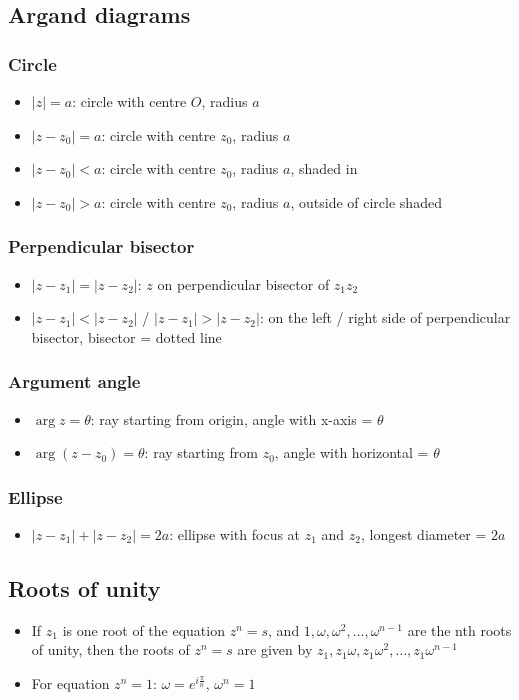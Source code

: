 \subsection{Argand diagrams}
\subsubsection{Circle}
\begin{itemize}
	\item $|z| = a$: circle with centre $O$, radius $a$
	\item $|z-z_0|=a$: circle with centre $z_0$, radius $a$
	\item $|z-z_0|<a$: circle with centre $z_0$, radius $a$, shaded in
	\item $|z-z_0|>a$: circle with centre $z_0$, radius $a$, outside of circle shaded
\end{itemize}
\subsubsection{Perpendicular bisector}
\begin{itemize}
	\item $|z-z_1|=|z-z_2|$: $z$ on perpendicular bisector of $z_1z_2$
	\item $|z-z_1|<|z-z_2|$ / $|z-z_1|>|z-z_2|$: on the left / right side of perpendicular bisector, bisector = dotted line
\end{itemize}
\subsubsection{Argument angle}
\begin{itemize}
	\item $\arg z = \theta$: ray starting from origin, angle with x-axis = $\theta$
	\item $\arg (z-z_0) = \theta$: ray starting from $z_0$, angle with horizontal = $\theta$
\end{itemize}
\subsubsection{Ellipse}
\begin{itemize}
	\item $|z-z_1|+|z-z_2|=2a$: ellipse with focus at $z_1$ and $z_2$, longest diameter = $2a$
\end{itemize}

\subsection{Roots of unity}
\begin{itemize}
	\item If $z_1$ is one root of the equation $z^n=s$, and $1,\omega,\omega^2,\dots,\omega^{n-1}$ are the nth roots of unity, then the roots of $z^n=s$ are given by $z_1, z_1\omega, z_1\omega^2, \dots, z_1\omega^{n-1}$
	\item For equation $z^n=1$: $\omega=e^{i\frac{\pi}{n}}$, $\omega^n=1$
\end{itemize}




